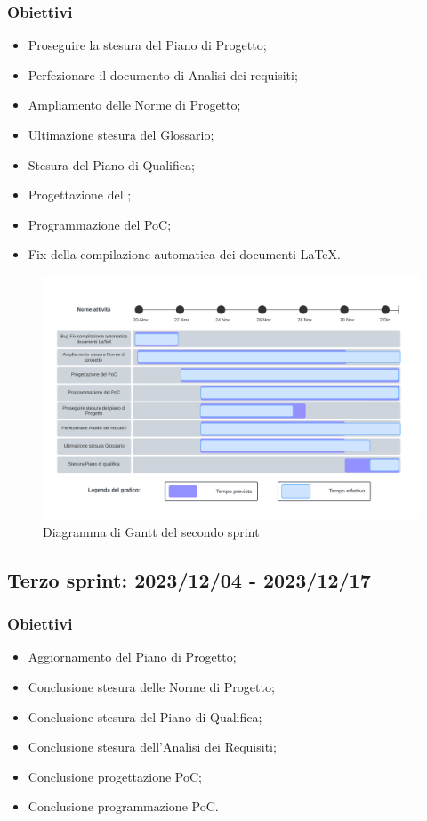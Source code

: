 \subsubsection{Obiettivi}
\begin{itemize}
    \item Proseguire la stesura del Piano di Progetto;
    \item Perfezionare il documento di Analisi dei requisiti;
    \item Ampliamento delle Norme di Progetto;
    \item Ultimazione stesura del Glossario;
    \item Stesura del Piano di Qualifica;
    \item Progettazione del ;
    \item Programmazione del PoC;
    \item {} Fix della compilazione automatica dei documenti \LaTeX.
\end{itemize}

\begin{figure}[h!]
    \centering  
    \includegraphics[width=\textwidth]{Roadmap2sprint.png}
    \caption{Diagramma di Gantt del secondo sprint}
    \label{fig:roadmap2s}
\end{figure}
\newpage

\subsection{Terzo sprint: 2023/12/04 - 2023/12/17}
\subsubsection{Obiettivi}
\begin{itemize}
    \item Aggiornamento del Piano di Progetto;
    \item Conclusione stesura delle Norme di Progetto;
    \item Conclusione stesura del Piano di Qualifica;
    \item Conclusione stesura dell'Analisi dei Requisiti;
    \item Conclusione progettazione PoC;
    \item Conclusione programmazione PoC.
\end{itemize}


